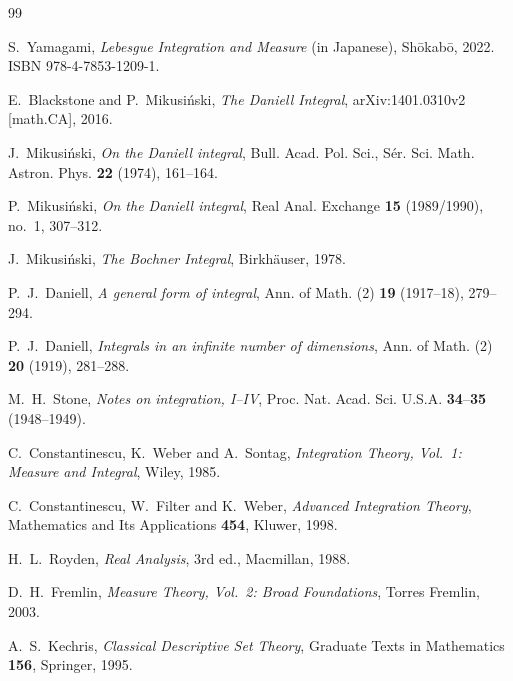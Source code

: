 \begin{thebibliography}{99}


S.~Yamagami,
\textit{Lebesgue Integration and Measure} (in Japanese),
Sh\=okab\=o, 2022.
ISBN 978-4-7853-1209-1.

E.~Blackstone and P.~Mikusi\'{n}ski,
\textit{The Daniell Integral},
arXiv:1401.0310v2 [math.CA], 2016.


J.~Mikusi\'{n}ski,
\textit{On the Daniell integral},
Bull. Acad. Pol. Sci., S\'{e}r. Sci. Math. Astron. Phys. \textbf{22} (1974), 161--164.

P.~Mikusi\'{n}ski,
\textit{On the Daniell integral},
Real Anal. Exchange \textbf{15} (1989/1990), no.~1, 307--312.

J.~Mikusi\'{n}ski,
\textit{The Bochner Integral},
Birkh\"{a}user, 1978.

P.~J.~Daniell,
\textit{A general form of integral},
Ann. of Math. (2) \textbf{19} (1917--18), 279--294.

P.~J.~Daniell,
\textit{Integrals in an infinite number of dimensions},
Ann. of Math. (2) \textbf{20} (1919), 281--288.

M.~H.~Stone,
\textit{Notes on integration, I--IV},
Proc. Nat. Acad. Sci. U.S.A. \textbf{34}--\textbf{35} (1948--1949).

C.~Constantinescu, K.~Weber and A.~Sontag,
\textit{Integration Theory, Vol.~1: Measure and Integral},
Wiley, 1985.

C.~Constantinescu, W.~Filter and K.~Weber,
\textit{Advanced Integration Theory},
Mathematics and Its Applications \textbf{454}, Kluwer, 1998.

H.~L.~Royden,
\textit{Real Analysis}, 3rd ed.,
Macmillan, 1988.

D.~H.~Fremlin,
\textit{Measure Theory, Vol.~2: Broad Foundations},
Torres Fremlin, 2003.


A.~S.~Kechris,
\textit{Classical Descriptive Set Theory},
Graduate Texts in Mathematics \textbf{156}, Springer, 1995.



\end{thebibliography}
